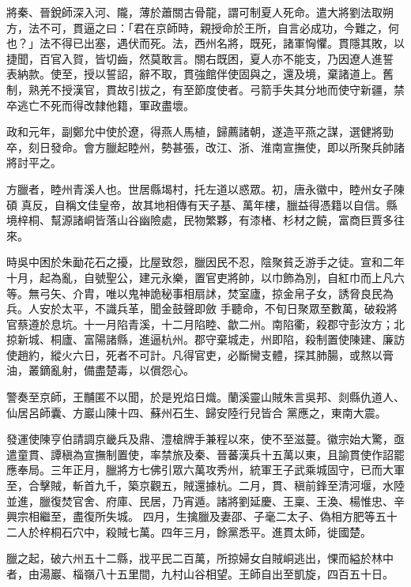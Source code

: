 \begin{pinyinscope}
 將秦、晉銳師深入河、隴，薄於蕭關古骨龍，謂可制夏人死命。遣大將劉法取朔方，法不可，貫逼之曰：「君在京師時，親授命於王所，自言必成功，今難之，何也？」法不得已出塞，遇伏而死。法，西州名將，既死，諸軍恟懼。貫隱其敗，以捷聞，百官入賀，皆切齒，然莫敢言。關右既困，夏人亦不能支，乃因遼人進誓
 表納款。使至，授以誓詔，辭不取，貫強館伴使固與之，還及境，棄諸道上。舊制，熟羌不授漢官，貫故引拔之，有至節度使者。弓箭手失其分地而使守新疆，禁卒逃亡不死而得改隸他籍，軍政盡壞。



 政和元年，副鄭允中使於遼，得燕人馬植，歸薦諸朝，遂造平燕之謀，選健將勁卒，刻日發命。會方臘起睦州，勢甚張，改江、浙、淮南宣撫使，即以所聚兵帥諸將討平之。



 方臘者，睦州青溪人也。世居縣堨村，托左道以惑眾。初，唐永徽中，睦州女子陳碩
 真反，自稱文佳皇帝，故其地相傳有天子基、萬年樓，臘益得憑籍以自信。縣境梓桐、幫源諸峒皆落山谷幽險處，民物繁夥，有漆楮、杉材之饒，富商巨賈多往來。



 時吳中困於朱勔花石之擾，比屋致怨，臘因民不忍，陰聚貧乏游手之徒。宣和二年十月，起為亂，自號聖公，建元永樂，置官吏將帥，以巾飾為別，自紅巾而上凡六等。無弓矢、介胄，唯以鬼神詭秘事相扇訹，焚室廬，掠金帛子女，誘脅良民為兵。人安於太平，不識兵革，聞金鼓聲即斂
 手聽命，不旬日聚眾至數萬，破殺將官蔡遵於息坑。十一月陷青溪，十二月陷睦、歙二州。南陷衢，殺郡守彭汝方；北掠新城、桐廬、富陽諸縣，進逼杭州。郡守棄城走，州即陷，殺制置使陳建、廉訪使趙約，縱火六日，死者不可計。凡得官吏，必斷臠支體，探其肺腸，或熬以膏油，叢鏑亂射，備盡楚毒，以償怨心。



 警奏至京師，王黼匿不以聞，於是兇焰日熾。蘭溪靈山賊朱言吳邦、剡縣仇道人、仙居呂師囊、方巖山陳十四、蘇州石生、歸安陸行兒皆合
 黨應之，東南大震。



 發運使陳亨伯請調京畿兵及鼎、澧槍牌手兼程以來，使不至滋蔓。徽宗始大驚，亟遣童貫、譚稹為宣撫制置使，率禁旅及秦、晉蕃漢兵十五萬以東，且諭貫使作詔罷應奉局。三年正月，臘將方七佛引眾六萬攻秀州，統軍王子武乘城固守，已而大軍至，合擊賊，斬首九千，築京觀五，賊還據杭。二月，貫、稹前鋒至清河堰，水陸並進，臘復焚官舍、府庫、民居，乃宵遁。諸將劉延慶、王稟、王渙、楊惟忠、辛興宗相繼至，盡復所失城。
 四月，生擒臘及妻邵、子毫二太子、偽相方肥等五十二人於梓桐石穴中，殺賊七萬。四年三月，餘黨悉平。進貫太師，徙國楚。



 臘之起，破六州五十二縣，戕平民二百萬，所掠婦女自賊峒逃出，惈而縊於林中者，由湯巖、椔嶺八十五里間，九村山谷相望。王師自出至凱旋，四百五十日。




\end{pinyinscope}
